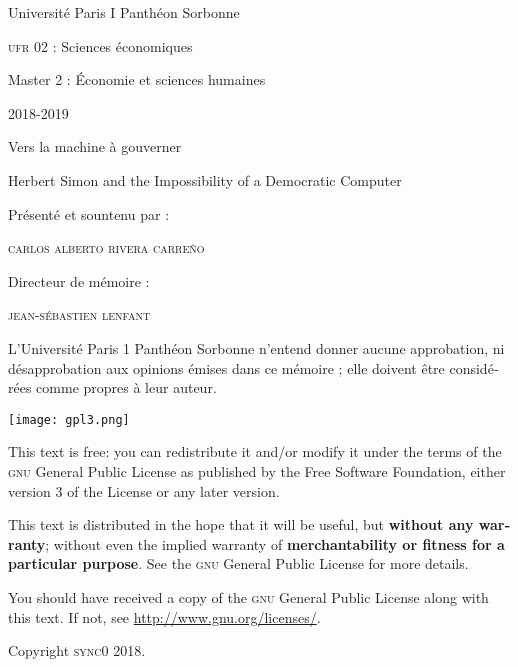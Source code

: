 \documentclass[paper=A4,portrait,twoside=true,twocolumn=true,headinclude=false,footinclude=false,fontsize=10,BCOR=15mm,DIV=13,pagesize=auto,titlepage=firstiscover,mpinclude=true,headings=twolinechapter,open=right,chapterprefix=false,numbers=noendperiod,headsepline=false,parskip=false]{scrbook}
\author{Carlos Alberto Rivera Carreño}
\date{}
\title{}
\theoremstyle{definition}
\begin{document}
\begin{titlepage}
 \centering
 \vspace{4\baselineskip}
\begin{french}
 {\Large Université Paris I Panthéon Sorbonne \par}
 {\Large \textsc{ufr} 02 : Sciences économiques  \par}
 {\large Master 2 : Économie et sciences humaines \par}
 {\large 2018-2019 \par}
\end{french}
 \vspace{2\baselineskip}
 {\huge Vers la machine à gouverner  \par}
 {\Large Herbert Simon and the Impossibility of a Democratic Computer \par}
\vspace*{\fill}
\begin{french}
 {\large Présenté et sountenu par : \par}
\end{french}
 {\large \textsc{carlos alberto rivera carreño}\par}
 \vspace{1\baselineskip}
\begin{french}
 {\large Directeur de mémoire : \par}
\end{french}
 {\large \textsc{jean-sébastien lenfant}\par}
\end{titlepage}

\onecolumn
\pagestyle{empty}

\begin{french}
L'Université Paris 1 Panthéon Sorbonne n'entend donner aucune approbation,
ni désapprobation aux opinions émises dans ce mémoire ; elle doivent être
considérées comme propres à leur auteur. 
\end{french}

\newpage
\vspace*{\fill}
\noindent
\texttt{[image: gpl3.png]}\par
\vspace{1\baselineskip}
\begin{english}
This text is free: you can redistribute it and/or modify it
under the terms of the \textsc{gnu} General Public License as published by
the Free Software Foundation, either version 3 of the License or any later
version.

This text is distributed in the hope that it will be useful, but \textbf{without
any warranty}; without even the implied warranty of \textbf{merchantability or 
fitness for a particular purpose}. See the \textsc{gnu} General 
Public License for more details.

You should have received a copy of the \textsc{gnu} General Public License along
with this text. If not, see \url{http://www.gnu.org/licenses/}.

\vspace{1\baselineskip}
\noindent
Copyright \textcopyright \textsc{sync0} 2018. 
\end{english}
\end{document}
